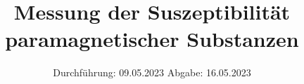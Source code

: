 

%

\subject{V606}
\title{Messung der Suszeptibilität paramagnetischer Substanzen}
\date{%
  Durchführung: 09.05.2023
  \hspace{3em}
  Abgabe: 16.05.2023
}


\setlength{\parindent}{0pt} %

\maketitle
\thispagestyle{empty}
\tableofcontents
\newpage



%



\printbibliography{}




